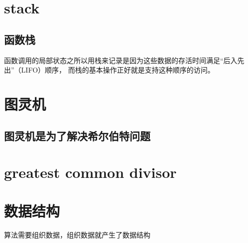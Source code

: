 \documentclass[UTF8]{ctexart}
\begin{document}
\section{stack}
\subsection{函数栈}
函数调用的局部状态之所以用栈来记录是因为这些数据的存活时间满足“后入先出”（LIFO）顺序，
而栈的基本操作正好就是支持这种顺序的访问。

\section{图灵机}
\subsection{图灵机是为了解决希尔伯特问题}

\section{greatest common divisor}

\section{数据结构}
算法需要组织数据，组织数据就产生了数据结构
\end{document}
